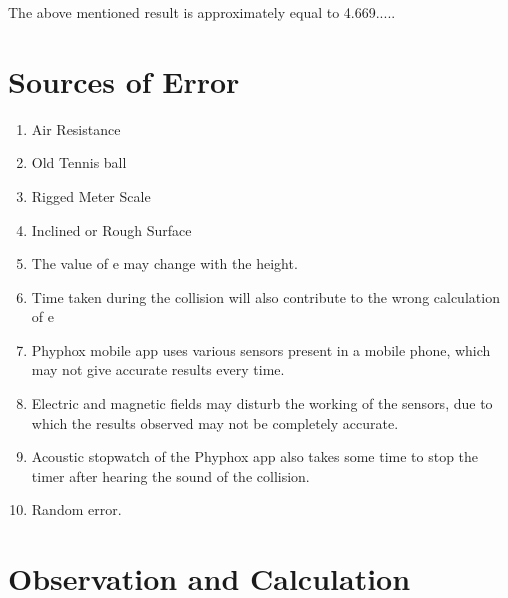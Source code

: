 \documentclass[11pt]{scrartcl} %
\begin{document}
The above mentioned result is approximately equal to 4.669.....
\section{Sources of Error}
\begin{enumerate}
	\item Air Resistance
	\item Old Tennis ball
	\item Rigged Meter Scale
	\item Inclined or Rough Surface
	\item The value of e may change with the height.
	\item Time taken during the collision will also contribute to the wrong calculation of e
	\item Phyphox mobile app uses various sensors present in a mobile phone, which may not give accurate results every time.
	\item Electric and magnetic fields may disturb the working of the sensors, due to which the results observed may not be completely accurate.
	\item Acoustic stopwatch of the Phyphox app also takes some time to stop the timer after hearing the sound of the collision.
	\item Random error.
\end{enumerate}
\newpage

\section{Observation and Calculation}
\end{document}
